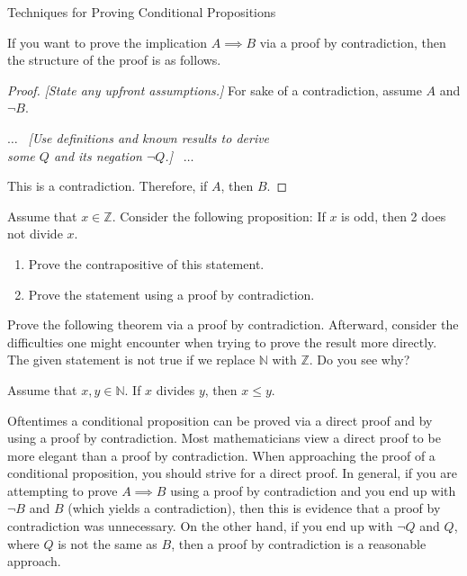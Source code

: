 \begin{section}{Techniques for Proving Conditional Propositions}
\begin{skeleton}\label{pf by contradiction for implication}
If you want to prove the implication $A\implies B$ via a proof by contradiction, then the structure of the proof is as follows.

\begin{mdframed}[style=skeleton]
\begin{proof}
\emph{[State any upfront assumptions.]} For sake of a contradiction, assume $A$ and $\neg B$.
\begin{center}
$\ldots$ \ \emph{[Use definitions and known results to derive\\ some $Q$ and its negation $\neg Q$.]} \ $\ldots$\\
\end{center}
\noindent This is a contradiction.  Therefore, if $A$, then $B$.
\end{proof}
\end{mdframed}
\end{skeleton}

\begin{problem}
Assume that $x\in\mathbb{Z}$.  Consider the following proposition: If $x$ is odd, then 2 does not divide $x$.
\begin{enumerate}[label=\textrm{(\alph*)}]
\item Prove the contrapositive of this statement.
\item Prove the statement using a proof by contradiction.
\end{enumerate}
\end{problem}

Prove the following theorem via a proof by contradiction. Afterward, consider the difficulties one might encounter when trying to prove the result more directly. The given statement is not true if we replace $\mathbb{N}$ with $\mathbb{Z}$. Do you see why?

\begin{theorem}\label{thm:natural divisor less than or equal to natural dividend}
Assume that $x,y\in\mathbb{N}$. If $x$ divides $y$, then $x\leq y$.
\end{theorem}

Oftentimes a conditional proposition can be proved via a direct proof and by using a proof by contradiction.  Most mathematicians view a direct proof to be more elegant than a proof by contradiction. When approaching the proof of a conditional proposition, you should strive for a direct proof.  In general, if you are attempting to prove $A\implies B$ using a proof by contradiction and you end up with $\neg B$ and $B$ (which yields a contradiction), then this is evidence that a proof by contradiction was unnecessary.  On the other hand, if you end up with $\neg Q$ and $Q$, where $Q$ is not the same as $B$, then a proof by contradiction is a reasonable approach.


\end{section}
